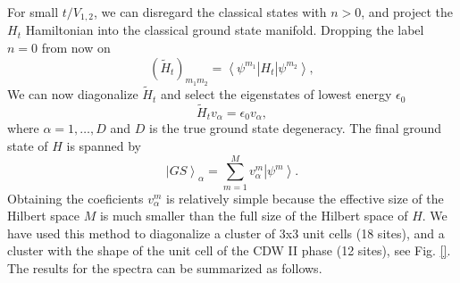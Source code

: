 \documentclass[aps,prx,10pt,twocolumn,floatfix,superscriptaddress,showpacs,numerical,footinbib]{revtex4-1}
\begin{document}
For small $t/V_{1,2}$, we can disregard the classical states with $n>0$, and project the $H_t$ Hamiltonian into the classical ground state manifold. 
%
Dropping the label $n=0$ from now on
%
\begin{equation}
(\tilde{H}_t)_{m_1m_2} =  \left< \psi^{m_1} \right| H_t \left| \psi^{m_2} \right>,
\end{equation}
%
We can now diagonalize $\tilde{H}_t$ and select the eigenstates of lowest energy $\epsilon_0$
%
\begin{equation}
\tilde{H}_t v_\alpha = \epsilon_0 v_\alpha,
\end{equation}
%
where $\alpha = 1,\ldots,D$ and $D$ is the true ground state degeneracy. The final ground state of $H$ is spanned by
%
\begin{equation}
\left| GS\right>_\alpha = \sum_{m=1}^M v^m_\alpha \left| \psi^m\right>.
\end{equation}
%
Obtaining the coeficients $v^m_\alpha$ is relatively simple because the effective size of the Hilbert space $M$ is much smaller than the full size of the Hilbert space of $H$.
%
We have used this method to diagonalize a cluster of 3x3 unit cells (18 sites), and a cluster with the shape of the unit cell of the CDW II phase (12 sites), see Fig. \ref{}. The results for the spectra can be summarized as follows. 
%
\end{document}
